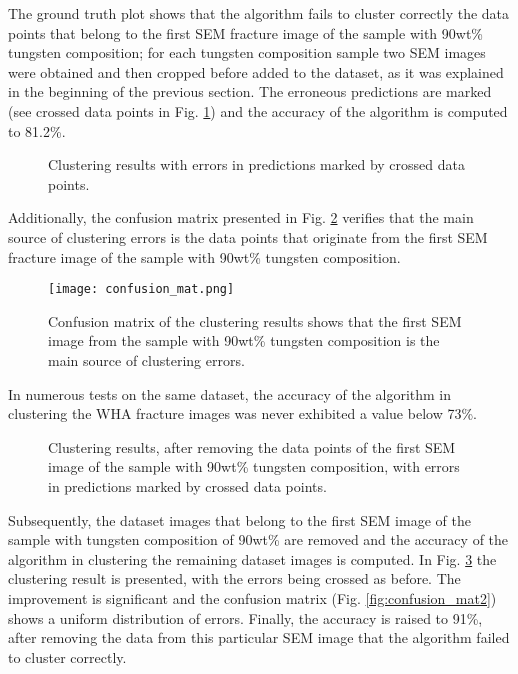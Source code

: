 \documentclass[authoryear,preprint,review,12pt, singleside]{elsarticle}
\begin{document}
The ground truth plot shows that the algorithm fails to cluster correctly the data points that belong to the first SEM fracture image of the sample with 90wt\% tungsten composition; for each tungsten composition sample two SEM images were obtained and then cropped before added to the dataset, as it was explained in the beginning of the previous section. The erroneous predictions are marked (see crossed data points in Fig. \ref{fig:cluster_result_errors}) and the accuracy of the algorithm is computed to 81.2\%.


\begin{figure}[!h]
	\centering
	\caption{Clustering results with errors in predictions marked by crossed data points.}
	\label{fig:cluster_result_errors}
\end{figure}

Additionally, the confusion matrix presented in Fig. \ref{fig:confusion_mat} verifies that the main source of clustering errors is the data points that originate from the first SEM fracture image of the  sample with 90wt\% tungsten composition.
 
\begin{figure}[!h]
	\centering
	\texttt{[image: confusion\_mat.png]}
	\caption{Confusion matrix of the clustering results shows that the first SEM image from the sample with 90wt\% tungsten composition is the main source of clustering errors.}
	\label{fig:confusion_mat}
\end{figure} 

In numerous tests on the same dataset, the accuracy of the algorithm in clustering the WHA fracture images was never exhibited a value below 73\%.


\begin{figure}[!h]
	\centering
	\caption{Clustering results, after removing the data points of the first SEM image of the sample with 90wt\% tungsten composition, with errors in predictions marked by crossed data points.}
	\label{fig:cluster_result_errors2}
\end{figure}


Subsequently, the dataset images that belong to the first SEM image of the sample with tungsten composition of 90wt\% are removed and the accuracy of the algorithm in clustering the remaining dataset images  is computed. In Fig. \ref{fig:cluster_result_errors2} the clustering result is presented, with the errors being crossed as before. The improvement is significant and the confusion matrix (Fig. \ref{fig:confusion_mat2}) shows a uniform distribution of errors. Finally, the accuracy is raised to 91\%, after removing the data from this particular SEM image that the algorithm failed to cluster correctly. 
\end{document}
